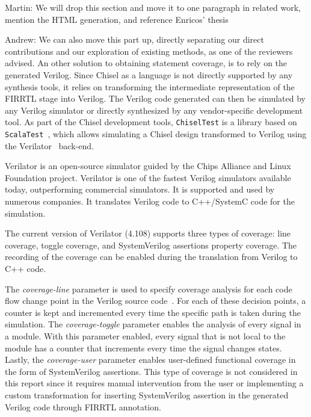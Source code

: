 \documentclass[conference]{IEEEtran}
\newcommand{\martin}[1]{{\color{blue} Martin: #1}}
\newcommand{\andrew}[1]{{\color{red} Andrew: #1}}
\begin{document}
\martin{We will drop this section and move it to one paragraph in related work,
mention the HTML generation, and reference Enricos' thesis}


\andrew{We can also move this part up, directly separating our direct contributions and our exploration of existing methods, as one of the reviewers advised.}
An other solution to obtaining statement coverage, is to rely on the generated Verilog. Since Chisel as a language is not directly supported by any synthesis tools, it relies on transforming the intermediate representation of the FIRRTL stage into Verilog. The Verilog code generated can then be simulated by any Verilog simulator or directly synthesized by any vendor-specific development tool. As part of the Chisel development tools, \texttt{ChiselTest} is a library based on \texttt{ScalaTest}~\cite{ScalaTest}, which allows simulating a Chisel design transformed to Verilog using the Verilator~\cite{verilator} back-end.

Verilator is an open-source simulator guided by the Chips Alliance and Linux Foundation project. Verilator is one of the fastest Verilog simulators available today, outperforming commercial simulators. It is supported and used by numerous companies. It translates Verilog code to C++/SystemC code for the simulation.

The current version of Verilator (4.108) supports three types of coverage: line coverage, toggle coverage, and SystemVerilog assertions property coverage. The recording of the coverage can be enabled during the translation from Verilog to C++ code.

The \textit{coverage-line} parameter is used to specify coverage analysis for each code flow change point in the Verilog source code~\cite{verilatormanual}. For each of these decision points, a counter is kept and incremented every time the specific path is taken during the simulation. The \textit{coverage-toggle} parameter enables the analysis of every signal in a module. With this parameter enabled, every signal that is not local to the module has a counter that increments every time the signal changes states. Lastly, the \textit{coverage-user} parameter enables user-defined functional coverage in the form of SystemVerilog assertions. This type of coverage is not considered in this report since it requires manual intervention from the user or implementing a custom transformation for inserting SystemVerilog assertion in the generated Verilog code through FIRRTL annotation.
\end{document}
